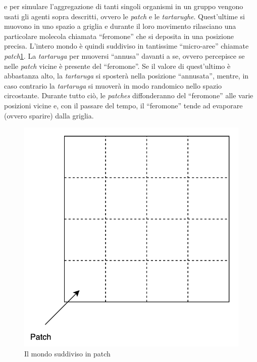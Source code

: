 e per simulare l'aggregazione di tanti singoli organismi in un gruppo vengono usati gli agenti sopra descritti, 
ovvero le \textit{patch} e le \textit{tartarughe}.
Quest'ultime si muovono in uno spazio a griglia e durante il loro movimento rilasciano una particolare molecola
chiamata ``feromone'' che si deposita in una posizione precisa. L'intero mondo è quindi suddiviso
in tantissime ``micro-aree'' chiamate \textit{patch}\space\cref{fig:patch}. La \textit{tartaruga} per muoversi 
``annusa'' davanti a se, ovvero percepisce se nelle \textit{patch} vicine è presente del ``feromone''. Se il valore di quest'ultimo è abbastanza alto, la 
\textit{tartaruga} si sposterà nella posizione ``annusata'', mentre, in caso contrario la \textit{tartaruga} si muoverà in modo randomico nello spazio circostante. 
Durante tutto ciò, le \textit{patches} diffonderanno del ``feromone'' alle varie posizioni vicine e, con il passare del tempo,
il ``feromone'' tende ad evaporare (ovvero sparire) dalla griglia.

\begin{figure}[ht]
    \centering
    \includegraphics[scale=0.6]{figures/patch.png}
    \caption{Il mondo suddiviso in patch}\label{fig:patch}
\end{figure}

